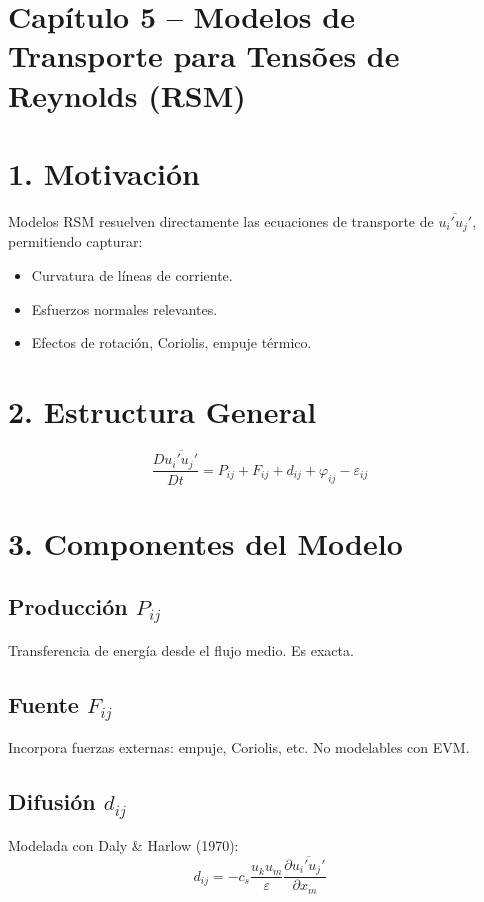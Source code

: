 \documentclass[a4paper,12pt]{article}
\begin{document}
	\newpage
	
	\section*{Capítulo 5 – Modelos de Transporte para Tensões de Reynolds (RSM)}
	
	\section*{1. Motivación}
	Modelos RSM resuelven directamente las ecuaciones de transporte de $\overline{u_i' u_j'}$, permitiendo capturar:
	\begin{itemize}
		\item Curvatura de líneas de corriente.
		\item Esfuerzos normales relevantes.
		\item Efectos de rotación, Coriolis, empuje térmico.
	\end{itemize}
	
	\section*{2. Estructura General}
	\[
	\frac{D \overline{u_i' u_j'}}{Dt} =
	P_{ij} + F_{ij} + d_{ij} + \varphi_{ij} - \varepsilon_{ij}
	\]
	
	\section*{3. Componentes del Modelo}
	
	\subsection*{Producción $P_{ij}$}
	Transferencia de energía desde el flujo medio. Es exacta.
	
	\subsection*{Fuente $F_{ij}$}
	Incorpora fuerzas externas: empuje, Coriolis, etc. No modelables con EVM.
	
	\subsection*{Difusión $d_{ij}$}
	Modelada con Daly \& Harlow (1970):
	\[
	d_{ij} = - c_s \frac{u_k u_m}{\varepsilon} \frac{\partial \overline{u_i' u_j'}}{\partial x_m}
	\]
	
\end{document}
